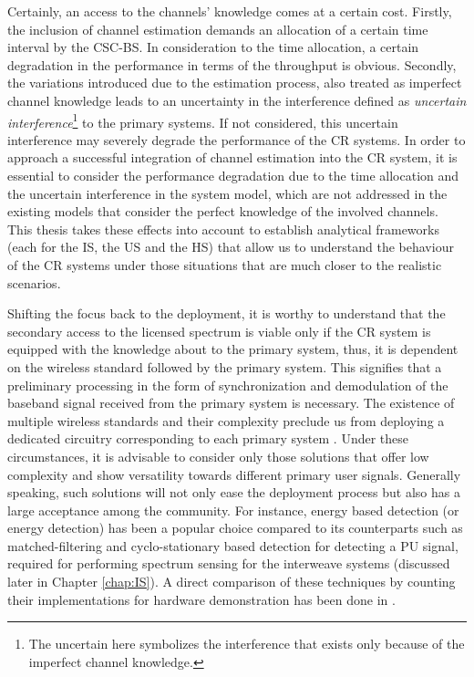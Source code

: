 Certainly, an access to the channels' knowledge comes at a certain cost. Firstly, the inclusion of channel estimation demands an allocation of a certain time interval by the CSC-BS. In consideration to the time allocation, a certain degradation in the performance in terms of the throughput is obvious. Secondly, the variations introduced due to the estimation process, also treated as imperfect channel knowledge leads to an uncertainty in the interference defined as \textit{uncertain interference}\footnote{The uncertain here symbolizes the interference that exists only because of the imperfect channel knowledge.} to the primary systems. If not considered, this uncertain interference may severely degrade the performance of the CR systems. In order to approach a successful integration of channel estimation into the CR system, it is essential to consider the performance degradation due to the time allocation and the uncertain interference in the system model, which are not addressed in the existing models that consider the perfect knowledge of the involved channels. This thesis takes these effects into account to establish analytical frameworks (each for the IS, the US and the HS) that allow us to understand the behaviour of the CR systems under those situations that are much closer to the realistic scenarios. %

Shifting the focus back to the deployment, it is worthy to understand that the secondary access to the licensed spectrum is viable only if the CR system is equipped with the knowledge about to the primary system, thus, it is dependent on the wireless standard followed by the primary system. This signifies that a preliminary processing in the form of synchronization and demodulation of the baseband signal received from the primary system is necessary. The existence of multiple wireless standards and their complexity preclude us from deploying a dedicated circuitry corresponding to each primary system \cite{Ghasemi08_cm}. Under these circumstances, it is advisable to consider only those solutions that offer low complexity and show versatility towards different primary user signals. Generally speaking, such solutions will not only ease the deployment process but also has a large acceptance among the community. For instance, energy based detection (or energy detection) has been a popular choice compared to its counterparts such as matched-filtering and cyclo-stationary based detection for detecting a PU signal, required for performing spectrum sensing for the interweave systems (discussed later in Chapter \ref{chap:IS}). A direct comparison of these techniques by counting their implementations for hardware demonstration has been done in \cite{Pawe11}. 

